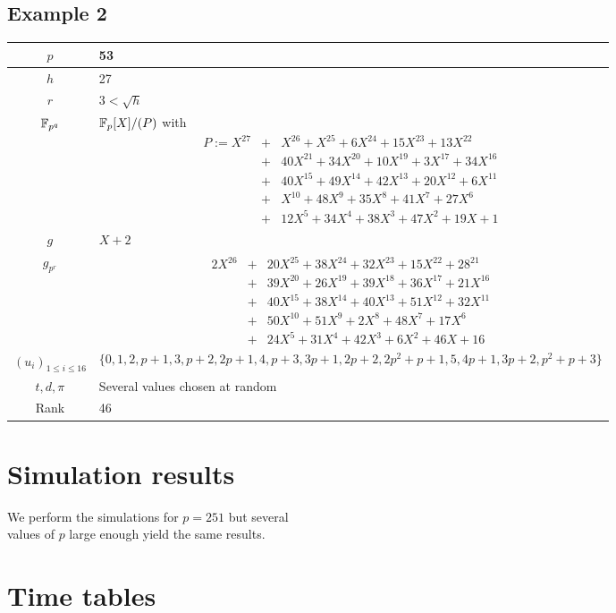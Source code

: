 \documentclass[a4paper]{article}
\newcommand{\GF}[1]{\F_{#1}}
\begin{document}
\newpage
\subsection{Example 2}
\label{Ex:2}



\begin{center}
\begin{tabularx}{\textwidth}{|c|X|} \hline
$p$ & 53  \\ \hline
$h$ & 27  \\ \hline
$r$ & $3 < \sqrt{h}$  \\ \hline
$\GF{p^q}$ & $\GF{p}[X] / (P)$ with
\begin{eqnarray*}
P := X^{27} &+& X^{26} + X^{25} + 6X^{24} + 15X^{23} + 13X^{22} \\
&+& 40X^{21} + 34X^{20} + 10X^{19} + 3X^{17} + 34X^{16}\\
&+& 40X^{15} + 49X^{14} + 42X^{13} + 20X^{12} + 6X^{11} \\
&+& X^{10} + 48X^9 + 35X^8 + 41X^7 + 27X^6 \\
&+& 12X^5 + 34X^4 + 38X^3 + 47X^2 + 19X + 1
\end{eqnarray*} \\ \hline
$g$ & $X+2$ \\ \hline
$g_{p^r}$ &  \begin{eqnarray*}
2X^{26} &+& 20X^{25} + 38X^{24} + 32X^{23} + 15X^{22} + 28^{21} \\
&+& 39X^{20} + 26X^{19} + 39X^{18} + 36X^{17} + 21X^{16}\\
&+& 40X^{15} + 38X^{14} + 40X^{13} + 51X^{12} + 32X^{11} \\
&+& 50X^{10} + 51X^9 + 2X^8 + 48X^7 + 17X^6 \\
&+& 24X^5 + 31X^4 + 42X^3 + 6X^2 + 46X + 16
\end{eqnarray*} \\ \hline
$(u_i)_{1 \leq i \leq 16}$ & $$\{ 0,1,2,p+1,3,p+2,2p+1,4,p+3,3p+1,2p+2,2p^2+p+1,5,4p+1,3p+2,p^2+p+3 \} $$ \\ \hline
$t, d, \pi$ & Several values chosen at random \\ \hline
Rank & 46 \\ \hline
\end{tabularx}
\end{center}


\newpage
\section{Simulation results}
\label{Sim:res}

We perform the simulations for $p = 251$ but several\\
values of $p$ large enough yield the same results.
\begin{minipage}[H]{30cm}

\end{minipage}


\newpage
\section{Time tables}
\label{Sim:time}
\end{document}
